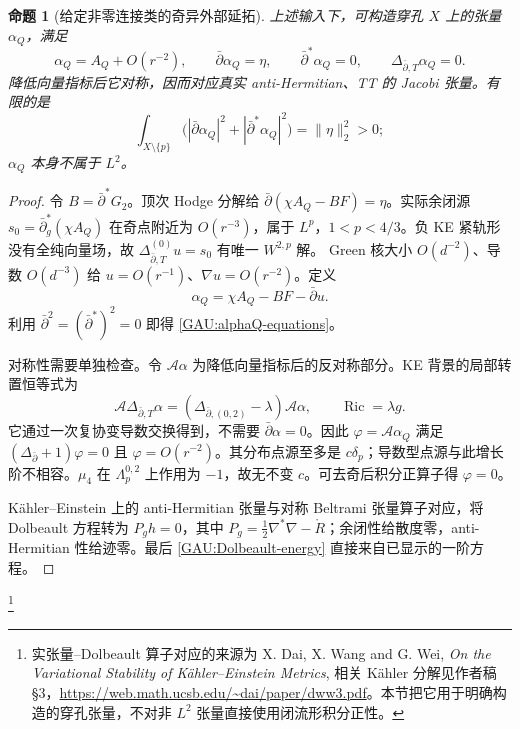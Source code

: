 \documentclass[UTF8,fontset=fandol,zihao=-4,oneside,openany]{ctexbook}
\theoremstyle{cjkplain}
\newtheorem{proposition}[theorem]{命题}
\numberwithin{equation}{chapter}
\begin{document}
\begin{proposition}[给定非零连接类的奇异外部延拓]\label{GAU:external-Jacobi}
上述输入下，可构造穿孔 $X$ 上的张量 $\alpha_Q$，满足
\begin{equation}\label{GAU:alphaQ-equations}
\alpha_Q=A_Q+O(r^{-2}),\qquad
\bar\partial\alpha_Q=\eta,\qquad\bar\partial^*\alpha_Q=0,
\qquad\Delta_{\bar\partial,T}\alpha_Q=0.
\end{equation}
降低向量指标后它对称，因而对应真实 anti-Hermitian、TT 的 Jacobi 张量。有限的是
\begin{equation}\label{GAU:Dolbeault-energy}
\int_{X\setminus\{p\}}\bigl(|\bar\partial\alpha_Q|^2+
|\bar\partial^*\alpha_Q|^2\bigr)=\|\eta\|_2^2>0;
\end{equation}
$\alpha_Q$ 本身不属于 $L^2$。
\end{proposition}
\begin{proof}
令 $B=\bar\partial^*G_2$。顶次 Hodge 分解给
$\bar\partial(\chi A_Q-BF)=\eta$。实际余闭源
$s_0=\bar\partial_g^*(\chi A_Q)$ 在奇点附近为 $O(r^{-3})$，属于 $L^p$，$1<p<4/3$。负 KE 紧轨形没有全纯向量场，故
$\Delta_{\bar\partial,T}^{(0)}u=s_0$ 有唯一 $W^{2,p}$ 解。
Green 核大小 $O(d^{-2})$、导数 $O(d^{-3})$ 给 $u=O(r^{-1})$、$\nabla u=O(r^{-2})$。定义
\[
\alpha_Q=\chi A_Q-BF-\bar\partial u.
\]
利用 $\bar\partial^2=(\bar\partial^*)^2=0$ 即得 \eqref{GAU:alphaQ-equations}。

对称性需要单独检查。令 $\mathcal A\alpha$ 为降低向量指标后的反对称部分。KE 背景的局部转置恒等式为
\[
\mathcal A\Delta_{\bar\partial,T}\alpha
=(\Delta_{\bar\partial,(0,2)}-\lambda)\mathcal A\alpha,
\qquad \operatorname{Ric}=\lambda g.
\]
它通过一次复协变导数交换得到，不需要 $\bar\partial\alpha=0$。因此 $\varphi=\mathcal A\alpha_Q$ 满足 $(\Delta_{\bar\partial}+1)\varphi=0$ 且 $\varphi=O(r^{-2})$。其分布点源至多是 $c\delta_p$；导数型点源与此增长阶不相容。$\mu_4$ 在 $\Lambda_p^{0,2}$ 上作用为 $-1$，故无不变 $c$。可去奇后积分正算子得 $\varphi=0$。

Kähler--Einstein 上的 anti-Hermitian 张量与对称 Beltrami 张量算子对应，将 Dolbeault 方程转为 $P_gh=0$，其中 $P_g=\frac12\nabla^*\nabla-\mathring R$；余闭性给散度零，anti-Hermitian 性给迹零。最后 \eqref{GAU:Dolbeault-energy} 直接来自已显示的一阶方程。
\end{proof}
\footnote{实张量--Dolbeault 算子对应的来源为 X. Dai, X. Wang and G. Wei, \emph{On the Variational Stability of Kähler--Einstein Metrics}, 相关 Kähler 分解见作者稿 §3，\url{https://web.math.ucsb.edu/~dai/paper/dww3.pdf}。本节把它用于明确构造的穿孔张量，不对非 $L^2$ 张量直接使用闭流形积分正性。}
\end{document}
